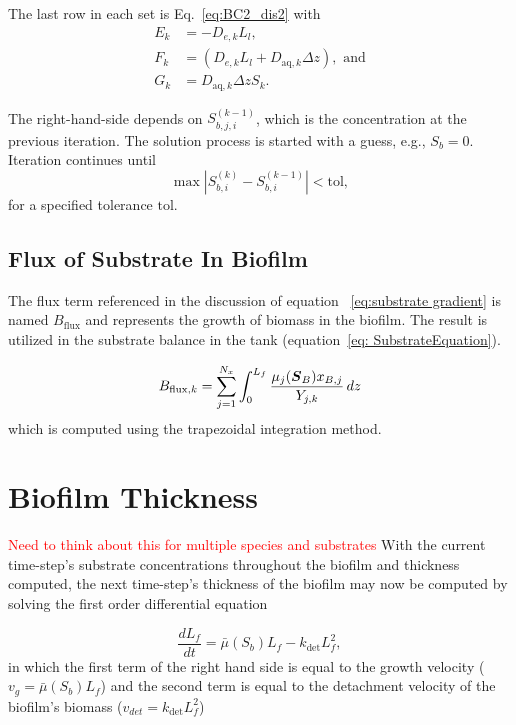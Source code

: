 \documentclass[letterpaper, twoside]{article}
\numberwithin{equation}{section}
\def\bm#1{\mbox{\boldmath{$#1$}}}
\begin{document}
The last row in each set is Eq.~\ref{eq:BC2_dis2} with
\begin{align}
  E_k&=-D_{e,k} L_l,\\
  F_k&=\left(D_{e,k} L_l + D_{\mathrm{aq},k} \Delta z\right),\text{ and}\\
  G_k&=D_{\mathrm{aq},k} \Delta z S_k.
\end{align}

The right-hand-side depends on $S_{b,j,i}^{(k-1)}$, which is the concentration at the previous iteration.  The solution process is started with a guess, e.g., $S_b=0$. Iteration continues until
\begin{equation*}
  \max\left| S_{b,i}^{(k)} - S_{b,i}^{(k-1)} \right| < \mathrm{tol},
\end{equation*}
for a specified tolerance $\mathrm{tol}$.

\subsection{Flux of Substrate In Biofilm}
The flux term referenced in the discussion of equation ~\ref{eq:substrate gradient} is named $B_\mathrm{flux}$ and represents the growth of biomass in the biofilm. The result is utilized in the substrate balance in the tank (equation~\ref{eq: SubstrateEquation}).

\begin{equation} \label{eq:Bflux}
  B_{\mathrm{flux},k} = \sum_{j=1}^{N_x} \int_0^{L_f} \frac{\mu_j(\bm{S}_B) x_{B,j}}{Y_{j,k}} \, dz %
\end{equation}
which is computed using the trapezoidal integration method. 

\section{Biofilm Thickness}\textcolor{red}{Need to think about this for multiple species and substrates}
With the current time-step's substrate concentrations throughout the biofilm and thickness computed, the next time-step's thickness of the biofilm may now be computed by solving the first order differential equation

\begin{equation}
  \label{eq:dLfdt_1}
  \frac{d L_f}{dt} = {\bar\mu(S_b) L_f}-{k_{\mathrm{det}}L_f^2},
\end{equation}
in which the first term of the right hand side is equal to the growth velocity ($v_g={\bar\mu(S_b) L_f}$) and the second term is equal to the detachment velocity of the biofilm's biomass ($v_{det}={k_{\mathrm{det}}L_f^2}$)
\end{document}
